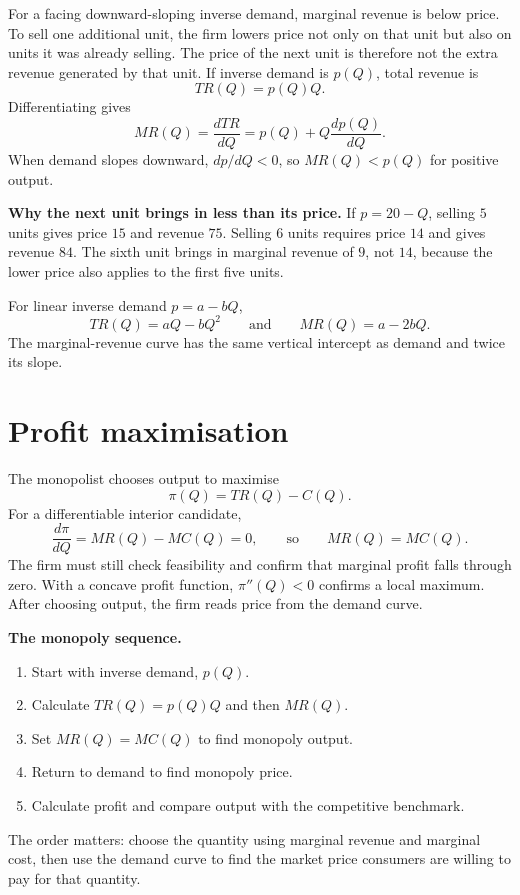 For a  facing downward-sloping inverse
demand, marginal revenue is below price. To sell one additional unit, the firm
lowers price not only on that unit but also on units it was already selling.
The price of the next unit is therefore not the extra revenue generated by
that unit.
If inverse demand is $p(Q)$, total revenue is
\[
TR(Q)=p(Q)Q.
\]
Differentiating gives
\[
MR(Q)=\frac{dTR}{dQ}
=p(Q)+Q\frac{dp(Q)}{dQ}.
\]
When demand slopes downward, $dp/dQ<0$, so $MR(Q)<p(Q)$ for positive output.

\begin{exercisebox}
\textbf{Why the next unit brings in less than its price.}
If $p=20-Q$, selling $5$ units gives price $15$ and revenue $75$. Selling
$6$ units requires price $14$ and gives revenue $84$. The sixth unit brings
in marginal revenue of $9$, not $14$, because the lower price also applies to
the first five units.
\end{exercisebox}

For linear inverse demand $p=a-bQ$,
\[
TR(Q)=aQ-bQ^2
\qquad\text{and}\qquad
MR(Q)=a-2bQ.
\]
The marginal-revenue curve has the same vertical intercept as demand and twice
its slope.

\section{Profit maximisation}

The monopolist chooses output to maximise
\[
\pi(Q)=TR(Q)-C(Q).
\]
For a differentiable interior candidate,
\[
\frac{d\pi}{dQ}=MR(Q)-MC(Q)=0,
\qquad\text{so}\qquad
MR(Q)=MC(Q).
\]
The firm must still check feasibility and confirm that marginal profit falls
through zero. With a concave profit function, $\pi''(Q)<0$ confirms a local
maximum. After choosing output, the firm reads price from the demand curve.

\begin{keyidea}
\textbf{The monopoly sequence.}
\begin{enumerate}
  \item Start with inverse demand, $p(Q)$.
  \item Calculate $TR(Q)=p(Q)Q$ and then $MR(Q)$.
  \item Set $MR(Q)=MC(Q)$ to find monopoly output.
  \item Return to demand to find monopoly price.
  \item Calculate profit and compare output with the competitive benchmark.
\end{enumerate}
The order matters: choose the quantity using marginal revenue and marginal
cost, then use the demand curve to find the market price consumers are willing
to pay for that quantity.
\end{keyidea}

